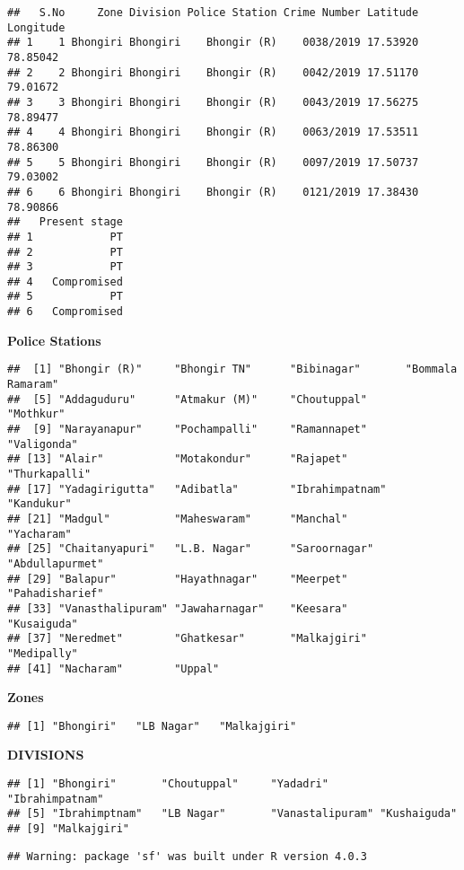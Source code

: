 \documentclass[
]{article}
\begin{document}
\begin{verbatim}
##   S.No     Zone Division Police Station Crime Number Latitude Longitude
## 1    1 Bhongiri Bhongiri    Bhongir (R)    0038/2019 17.53920  78.85042
## 2    2 Bhongiri Bhongiri    Bhongir (R)    0042/2019 17.51170  79.01672
## 3    3 Bhongiri Bhongiri    Bhongir (R)    0043/2019 17.56275  78.89477
## 4    4 Bhongiri Bhongiri    Bhongir (R)    0063/2019 17.53511  78.86300
## 5    5 Bhongiri Bhongiri    Bhongir (R)    0097/2019 17.50737  79.03002
## 6    6 Bhongiri Bhongiri    Bhongir (R)    0121/2019 17.38430  78.90866
##   Present stage
## 1            PT
## 2            PT
## 3            PT
## 4   Compromised
## 5            PT
## 6   Compromised
\end{verbatim}

\textbf{Police Stations}

\begin{verbatim}
##  [1] "Bhongir (R)"     "Bhongir TN"      "Bibinagar"       "Bommala Ramaram"
##  [5] "Addaguduru"      "Atmakur (M)"     "Choutuppal"      "Mothkur"        
##  [9] "Narayanapur"     "Pochampalli"     "Ramannapet"      "Valigonda"      
## [13] "Alair"           "Motakondur"      "Rajapet"         "Thurkapalli"    
## [17] "Yadagirigutta"   "Adibatla"        "Ibrahimpatnam"   "Kandukur"       
## [21] "Madgul"          "Maheswaram"      "Manchal"         "Yacharam"       
## [25] "Chaitanyapuri"   "L.B. Nagar"      "Saroornagar"     "Abdullapurmet"  
## [29] "Balapur"         "Hayathnagar"     "Meerpet"         "Pahadisharief"  
## [33] "Vanasthalipuram" "Jawaharnagar"    "Keesara"         "Kusaiguda"      
## [37] "Neredmet"        "Ghatkesar"       "Malkajgiri"      "Medipally"      
## [41] "Nacharam"        "Uppal"
\end{verbatim}

\textbf{Zones}

\begin{verbatim}
## [1] "Bhongiri"   "LB Nagar"   "Malkajgiri"
\end{verbatim}

\textbf{DIVISIONS}

\begin{verbatim}
## [1] "Bhongiri"       "Choutuppal"     "Yadadri"        "Ibrahimpatnam" 
## [5] "Ibrahimptnam"   "LB Nagar"       "Vanastalipuram" "Kushaiguda"    
## [9] "Malkajgiri"
\end{verbatim}

\begin{verbatim}
## Warning: package 'sf' was built under R version 4.0.3
\end{verbatim}
\end{document}
